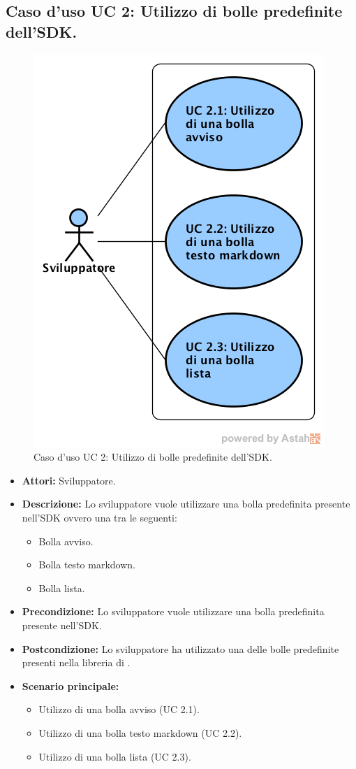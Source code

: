 \newpage
\subsection{Caso d'uso UC 2: Utilizzo di bolle predefinite dell'SDK.}
\label{Caso d'uso UC 2: Utilizzo di bolle predefinite dell'SDK.}
\begin{figure}[ht]
	\centering
	\includegraphics[scale=0.60]{Usecases/img/UC2.png}
	\caption{Caso d'uso UC 2: Utilizzo di bolle predefinite dell'SDK.}
\end{figure}

\FloatBarrier
\begin{itemize}
\item \textbf{Attori:} Sviluppatore.
\item \textbf{Descrizione:} Lo sviluppatore vuole utilizzare una bolla predefinita presente nell'SDK ovvero una tra le seguenti:
\begin{itemize}
\item Bolla avviso.
\item Bolla testo markdown.
\item Bolla lista.
\end{itemize} 
\item \textbf{Precondizione:} Lo sviluppatore vuole utilizzare una bolla predefinita presente nell'SDK. 
\item \textbf{Postcondizione:} Lo sviluppatore ha utilizzato una delle bolle predefinite presenti nella libreria di \progetto.
\item \textbf{Scenario principale:}
	\begin{itemize}
	\item{Utilizzo di una bolla avviso (UC 2.1).}
	\item{Utilizzo di una bolla testo markdown (UC 2.2).}
	\item{Utilizzo di una bolla lista (UC 2.3).}
	\end{itemize}
\end{itemize}